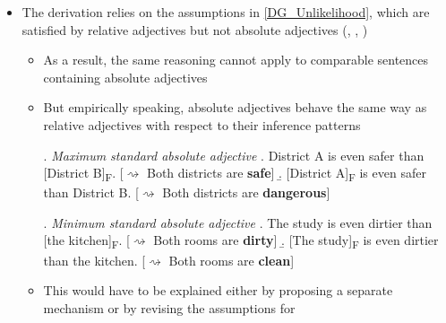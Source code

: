 \documentclass[11pt,letterpaper]{scrartcl}
\newcommand{\alignright}{\hspace*{\fill}}
\newcommand{\infer}{$\rightsquigarrow$ }
\newcommand{\sub}[1]{\textsubscript{#1}}
\begin{document}
\begin{itemize}
\begin{itemize}
\begin{itemize}
                    \item $p =$ \textit{Alex is taller than Blake} is less likely than $q =$ \textit{Alex is taller than Aaron} simply because that it's more likely for a kid to be taller than someone of their own age than to be taller than someone older
                    
                    \item Importantly, it doesn't have to the case that Blake is strictly taller than Aaron in actuality
                    
                    \item A separate, well-defined machinery is needed to explain why and how likelihoods of propositions are translated to degrees on a scale
                    
                \end{itemize}
            
            \item The derivation relies on the assumptions in \ref{DG_Unlikelihood}, which are satisfied by relative adjectives but not absolute adjectives (\cite{kennedy_vagueness_2007}, \cite{toledo_absolute_2011}, \cite{lassiter_context_2013})
            
            \begin{itemize}
                \item As a result, the same reasoning cannot apply to comparable sentences containing absolute adjectives
                
                \item But empirically speaking, absolute adjectives behave the same way as relative adjectives with respect to their inference patterns
                
                \ex.\label{safe} \textit{Maximum standard absolute adjective}
                \a. District A is even safer than [District B]\sub{F}. \alignright [\infer Both districts are \textbf{safe}]
                \b. [District A]\sub{F} is even safer than District B. \alignright [\infer Both districts are \textbf{dangerous}]
                
                \ex.\label{dirty} \textit{Minimum standard absolute adjective}
                \a. The study is even dirtier than [the kitchen]\sub{F}. \alignright [\infer Both rooms are \textbf{dirty}]
                \b. [The study]\sub{F} is even dirtier than the kitchen. \alignright [\infer Both rooms are \textbf{clean}]
                
                \item This would have to be explained either by proposing a separate mechanism or by revising the assumptions for \cite{daniels_even_2020}
                
            \end{itemize}
            
                
        \end{itemize}
    
    \end{itemize}
    
\end{document}
